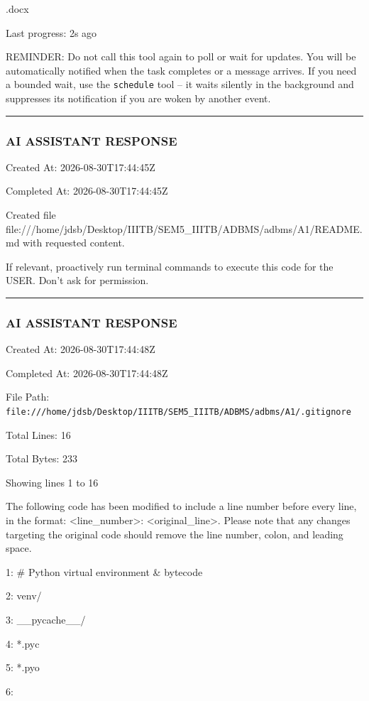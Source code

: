 \documentclass[11pt,a4paper]{article}
\begin{document}
{.docx


Last progress: 2s ago



REMINDER: Do not call this tool again to poll or wait for updates. You will be automatically notified when the task completes or a message arrives. If you need a bounded wait, use the \texttt{schedule} tool -- it waits silently in the background and suppresses its notification if you are woken by another event.


\hrule

\subsubsection{AI ASSISTANT RESPONSE}

Created At: 2026-08-30T17:44:45Z

Completed At: 2026-08-30T17:44:45Z

Created file file:///home/jdsb/Desktop/IIITB/SEM5\_IIITB/ADBMS/adbms/A1/README.md with requested content.

If relevant, proactively run terminal commands to execute this code for the USER. Don't ask for permission.


\hrule

\subsubsection{AI ASSISTANT RESPONSE}

Created At: 2026-08-30T17:44:48Z

Completed At: 2026-08-30T17:44:48Z

File Path: \texttt{file:///home/jdsb/Desktop/IIITB/SEM5\_IIITB/ADBMS/adbms/A1/.gitignore}

Total Lines: 16

Total Bytes: 233

Showing lines 1 to 16

The following code has been modified to include a line number before every line, in the format: <line\_number>: <original\_line>. Please note that any changes targeting the original code should remove the line number, colon, and leading space.

1: \# Python virtual environment \& bytecode

2: venv/

3: \_\_pycache\_\_/

4: *.pyc

5: *.pyo

6:

}
\end{document}
